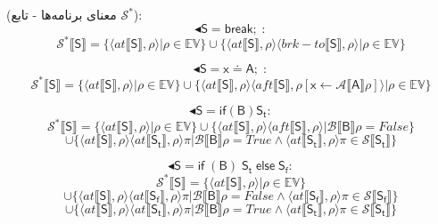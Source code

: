 \begin{defn}
	(معنای برنامه‌ها - تابع $\mathcal{S}^*$): 
	$$\blacktriangleleft\mathsf{S} = \mathsf{break;}\;:$$
	$$\mathcal{S^*} \llbracket\mathsf{S}\rrbracket = \{ \langle at\llbracket\mathsf{S}\rrbracket , \rho \rangle | \rho \in \mathbb{EV}       \} \cup     \{ \langle at\llbracket\mathsf{S}\rrbracket , \rho \rangle \langle brk-to\llbracket\mathsf{S}\rrbracket , \rho \rangle | \rho \in \mathbb{EV}       \}             $$   
	
	
	$$\blacktriangleleft\mathsf{S}=\mathsf{x\doteq A;}\;:$$
	$$\mathcal{S^*} \llbracket\mathsf{S}\rrbracket = \{ \langle at\llbracket\mathsf{S}\rrbracket , \rho \rangle | \rho \in \mathbb{EV}       \} \cup     \{ \langle at\llbracket\mathsf{S}\rrbracket , \rho \rangle \langle aft\llbracket\mathsf{S}\rrbracket , \rho[\mathsf{x}\leftarrow \mathcal{A}\llbracket\mathsf{A}\rrbracket\rho] \rangle | \rho \in \mathbb{EV}       \}             $$   
	
	$$\blacktriangleleft\mathsf{S}= \mathsf{if}  \mathsf{ (B) S_t}:$$
	$$\mathcal{S^*} \llbracket\mathsf{S}\rrbracket = \{ \langle at\llbracket\mathsf{S}\rrbracket , \rho \rangle | \rho \in \mathbb{EV}       \} \cup     \{ \langle at\llbracket\mathsf{S}\rrbracket , \rho \rangle \langle aft\llbracket\mathsf{S}\rrbracket , \rho \rangle | \mathcal{B}\llbracket\mathsf{B}\rrbracket \rho =False      \} 
	$$$$\cup    \{ \langle at\llbracket\mathsf{S}\rrbracket , \rho \rangle \langle at\llbracket\mathsf{S_t}\rrbracket , \rho \rangle 
	\pi | \mathcal{B}\llbracket\mathsf{B}\rrbracket \rho =True  \wedge   \langle  at\llbracket\mathsf{S_t}\rrbracket  , \rho \rangle \pi \in \mathcal{S} \llbracket\mathsf{S_t}\rrbracket    \}          $$ 
	
	
	$$\blacktriangleleft\mathsf{S} = \mathsf{if}  \mathsf{ \;(B)\;S_t\;else\;S_f}:$$
	$$\mathcal{S^*} \llbracket\mathsf{S}\rrbracket = \{ \langle at\llbracket\mathsf{S}\rrbracket , \rho \rangle | \rho \in \mathbb{EV}       \} $$$$\cup     \{ \langle at\llbracket\mathsf{S}\rrbracket , \rho \rangle \langle at\llbracket\mathsf{S_f}\rrbracket , \rho \rangle 
	\pi | \mathcal{B}\llbracket\mathsf{B}\rrbracket \rho =False  \wedge   \langle  at\llbracket\mathsf{S_f}\rrbracket  , \rho \rangle \pi \in \mathcal{S} \llbracket\mathsf{S_f}\rrbracket    \}  
	$$$$\cup    \{ \langle at\llbracket\mathsf{S}\rrbracket , \rho \rangle \langle at\llbracket\mathsf{S_t}\rrbracket , \rho \rangle 
	\pi | \mathcal{B}\llbracket\mathsf{B}\rrbracket \rho =True  \wedge   \langle  at\llbracket\mathsf{S_t}\rrbracket  , \rho \rangle \pi \in \mathcal{S} \llbracket\mathsf{S_t}\rrbracket    \}          $$ \\
	

\end{defn}
